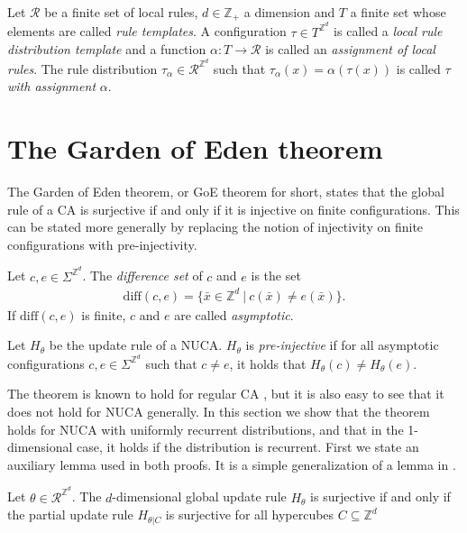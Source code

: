 \documentclass[runningheads]{llncs}
\newcommand{\Z}{\mathbb{Z}}
\newcommand{\set}[2]{\{ #1 \: | \: #2 \}}
\newcommand{\confspace}{\Sigma^{\Z^d}}
\begin{document}
\begin{definition} 
Let $\mathcal{R}$ be a finite set of local rules, $d\in \Z_+$ a dimension and $T$ a finite set whose elements are called \emph{rule templates}. A configuration $\tau \in T^{\Z^d}$ is called a \emph{local rule distribution template} and a function $\alpha:T\rightarrow \mathcal{R}$ is called an \emph{assignment of local rules}. The rule distribution $\tau_\alpha \in \mathcal{R}^{\Z^d}$ such that $\tau_\alpha (x) = \alpha (\tau (x))$ is called $\tau$ \emph{with assignment} $\alpha$.
\end{definition}

\section{The Garden of Eden theorem}

The Garden of Eden theorem, or GoE theorem for short, states that the global rule of a CA is surjective if and only if it is injective on finite configurations. This can be stated more generally by replacing the notion of injectivity on finite configurations with pre-injectivity.

\begin{definition}
Let $c,e \in \Sigma^{\Z^d}$. The \emph{difference set} of $c$ and $e$ is the set
\begin{align*}
\mathrm{diff}(c,e) = \set{\bar x\in \Z^d}{c(\bar x) \neq e(\bar x)}.
\end{align*}
If $\mathrm{diff}(c,e)$ is finite, $c$ and $e$ are called \emph{asymptotic}.
\end{definition}

\begin{definition}
Let $H_\theta$ be the update rule of a NUCA. $H_\theta$ is \emph{pre-injective} if for all asymptotic configurations $c,e \in \confspace$ such that $c \neq e$, it holds that $H_\theta (c) \neq H_\theta (e)$.
\end{definition}

The theorem is known to hold for regular CA \cite{moore,myhill}, but it is also easy to see that it does not hold for NUCA generally. %
In this section we show that the theorem holds for NUCA with uniformly recurrent distributions, and that in the 1-dimensional case, it holds if the distribution is recurrent. 
First we state an auxiliary lemma used in both proofs. It is a simple generalization of a lemma in \cite{dennuz2}.

\begin{lemma} \label{orphan}
Let $\theta \in \mathcal{R}^{\Z^d}$. The $d$-dimensional global update rule $H_\theta$ is surjective if and only if the partial update rule $H_{\theta|C}$ is surjective for all hypercubes $C\subseteq \Z^d$
\end{lemma}
\end{document}
